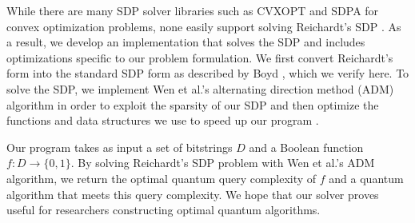 While there are many SDP solver libraries such as CVXOPT and
SDPA for convex optimization problems,
none easily support solving Reichardt's SDP
\cite{cvxopt, SDPA}.
As a result, we develop an implementation that solves the SDP
and includes optimizations specific to our problem formulation.
We first convert Reichardt's form into the standard SDP form
as described by Boyd \cite{boyd2004convex}, which we verify here.
To solve the SDP, we implement Wen et al.'s alternating direction method (ADM)
algorithm in order to exploit the sparsity of our SDP
and then optimize the functions and data structures we use
to speed up our program \cite{adm}. 

Our program takes as input a set of bitstrings $D$
and a Boolean function $f: D \rightarrow \{0,1\}$. 
By solving Reichardt's SDP problem with
Wen et al.'s ADM algorithm,
we return the optimal quantum query complexity of $f$
and a quantum algorithm that meets this query complexity.
We hope that our solver proves useful
for researchers constructing optimal quantum algorithms.
